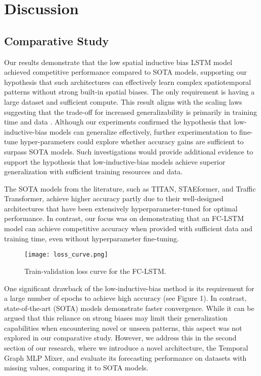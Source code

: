 \documentclass{article}
\theoremstyle{plain}
\theoremstyle{definition}
\theoremstyle{remark}
\begin{document}
\section{Discussion}

\subsection{Comparative Study}

Our results demonstrate that the low spatial inductive bias LSTM model achieved competitive performance compared to SOTA models, supporting our hypothesis that such architectures can effectively learn complex spatiotemporal patterns without strong built-in spatial biases. The only requirement is having a large dataset and sufficient compute. This result aligns with the scaling laws suggesting that the trade-off for increased generalizability is primarily in training time and data \cite{bachmann2024scaling}. Although our experiments confirmed the hypothesis that low-inductive-bias models can generalize effectively, further experimentation to fine-tune hyper-parameters could explore whether accuracy gains are sufficient to surpass SOTA models. Such investigations would provide additional evidence to support the hypothesis that low-inductive-bias models achieve superior generalization with sufficient training resources and data.

The SOTA models from the literature, such as TITAN, STAEformer, and Traffic Transformer, achieve higher accuracy partly due to their well-designed architectures that have been extensively hyperparameter-tuned for optimal performance. In contrast, our focus was on demonstrating that an FC-LSTM model can achieve competitive accuracy when provided with sufficient data and training time, even without hyperparameter fine-tuning.

\begin{figure}[h!]
    \centering
    \texttt{[image: loss\_curve.png]}
    \caption{Train-validation loss curve for the FC-LSTM.}
    \label{fig:loss_curve}
\end{figure}

One significant drawback of the low-inductive-bias method is its requirement for a large number of epochs to achieve high accuracy (see Figure 1). In contrast, state-of-the-art (SOTA) models demonstrate faster convergence. While it can be argued that this reliance on strong biases may limit their generalization capabilities when encountering novel or unseen patterns, this aspect was not explored in our comparative study. However, we address this in the second section of our research, where we introduce a novel architecture, the Temporal Graph MLP Mixer, and evaluate its forecasting performance on datasets with missing values, comparing it to SOTA models.
\end{document}
